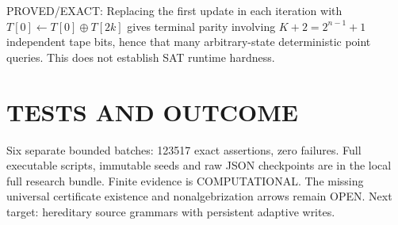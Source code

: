 \documentclass{article}
\begin{document}
\noindent PROVED/EXACT: Replacing the first update in each iteration with $T[0]\gets T[0]\oplus T[2k]$ gives terminal parity involving $K+2=2^{n-1}+1$ independent tape bits, hence that many arbitrary-state deterministic point queries. This does not establish SAT runtime hardness.

\section{TESTS AND OUTCOME}
Six separate bounded batches: 123517 exact assertions, zero failures. Full executable scripts, immutable seeds and raw JSON checkpoints are in the local full research bundle. Finite evidence is COMPUTATIONAL. The missing universal certificate existence and nonalgebrization arrows remain OPEN. Next target: hereditary source grammars with persistent adaptive writes.
\end{document}
